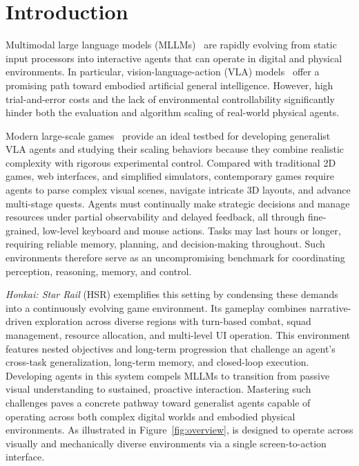 \section{Introduction}

Multimodal large language models (MLLMs)~\cite{qwen2vl,qwenvl,dong2025seedvl,internvl2,internvl2.5,luo2026next} are rapidly evolving from static input processors into interactive agents that can operate in digital and physical environments. In particular, vision-language-action (VLA) models~\cite{wang2024gui,nguyen2025gui,luo2025gui,gamescaling} offer a promising path toward embodied artificial general intelligence. However, high trial-and-error costs and the lack of environmental controllability significantly hinder both the evaluation and algorithm scaling of real-world physical agents.

Modern large-scale games~\cite{fan2022minedojo,baker2022vpt, gameverse, wang2026gamehorizon,towards,videoarena, gameworld2026,luo2026ai} provide an ideal testbed for developing generalist VLA agents and studying their scaling behaviors because they combine realistic complexity with rigorous experimental control. Compared with traditional 2D games, web interfaces, and simplified simulators, contemporary games require agents to parse complex visual scenes, navigate intricate 3D layouts, and advance multi-stage quests. Agents must continually make strategic decisions and manage resources under partial observability and delayed feedback, all through fine-grained, low-level keyboard and mouse actions. Tasks may last hours or longer, requiring reliable memory, planning, and decision-making throughout. Such environments therefore serve as an uncompromising benchmark for coordinating perception, reasoning, memory, and control.

\textit{Honkai: Star Rail} (HSR) exemplifies this setting by condensing these demands into a continuously evolving game environment. Its gameplay combines narrative-driven exploration across diverse regions with turn-based combat, squad management, resource allocation, and multi-level UI operation. This environment features nested objectives and long-term progression that challenge an agent's cross-task generalization, long-term memory, and closed-loop execution. Developing agents in this system compels MLLMs to transition from passive visual understanding to sustained, proactive interaction. Mastering such challenges paves a concrete pathway toward generalist agents capable of operating across both complex digital worlds and embodied physical environments. As illustrated in Figure~\ref{fig:overview}, \ourmodel is designed to operate across visually and mechanically diverse environments via a single screen-to-action interface.

